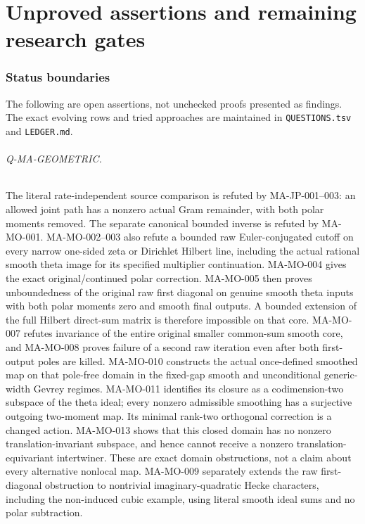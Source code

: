 \documentclass[11pt,a4paper]{article}
\begin{document}
\part{Unproved assertions and remaining research gates}
\section{Status boundaries}
The following are open assertions, not unchecked proofs presented
as findings. The exact evolving rows and tried approaches are
maintained in \texttt{QUESTIONS.tsv} and \texttt{LEDGER.md}.

\paragraph{Q-MA-GEOMETRIC.}
The literal rate-independent source comparison is refuted by
MA-JP-001--003: an allowed joint path has a nonzero actual Gram
remainder, with both polar moments removed. The separate canonical
bounded inverse is refuted by MA-MO-001. MA-MO-002--003 also
refute a bounded raw Euler-conjugated cutoff on every narrow
one-sided zeta or Dirichlet Hilbert line, including the actual
rational smooth theta image for its specified multiplier
continuation. MA-MO-004 gives the exact original/continued polar correction.
MA-MO-005 then proves unboundedness of the original raw first
diagonal on genuine smooth theta inputs with both polar moments
zero and smooth final outputs. A bounded extension of the full
Hilbert direct-sum matrix is therefore impossible on that core.
MA-MO-007 refutes invariance of the entire original smaller
common-sum smooth core, and MA-MO-008 proves failure of a
second raw iteration even after both first-output poles are
killed. MA-MO-010 constructs the actual once-defined smoothed
map on that pole-free domain in the fixed-gap smooth and
unconditional generic-width Gevrey regimes. MA-MO-011 identifies
its closure as a codimension-two subspace of the theta ideal;
every nonzero admissible smoothing has a surjective outgoing
two-moment map. Its minimal rank-two orthogonal correction is
a changed action. MA-MO-013 shows that this closed domain has
no nonzero translation-invariant subspace, and hence cannot
receive a nonzero translation-equivariant intertwiner.
These are exact domain obstructions, not a claim about every
alternative nonlocal map. MA-MO-009 separately extends the
raw first-diagonal obstruction to nontrivial imaginary-quadratic
Hecke characters, including the non-induced cubic example,
using literal smooth ideal sums and no polar subtraction.
\end{document}
